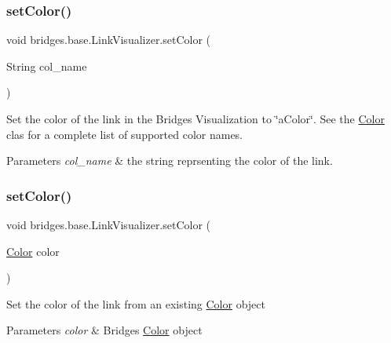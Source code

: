 \subsubsection{\texorpdfstring{set\+Color()}{setColor()}\hspace{0.1cm}{\footnotesize\ttfamily [1/3]}}
{\footnotesize\ttfamily void bridges.\+base.\+Link\+Visualizer.\+set\+Color (\begin{DoxyParamCaption}\item[{String}]{col\+\_\+name }\end{DoxyParamCaption})}

Set the color of the link in the Bridges Visualization to \char`\"{}a\+Color\char`\"{}. See the \mbox{\hyperlink{classbridges_1_1base_1_1_color}{Color}} clas for a complete list of supported color names.


\begin{DoxyParams}{Parameters}
{\em col\+\_\+name} & the string reprsenting the color of the link. \\
\hline
\end{DoxyParams}
\mbox{\label{classbridges_1_1base_1_1_link_visualizer_ab05a7576f99818937276a4937eedeee1}} 
\subsubsection{\texorpdfstring{set\+Color()}{setColor()}\hspace{0.1cm}{\footnotesize\ttfamily [2/3]}}
{\footnotesize\ttfamily void bridges.\+base.\+Link\+Visualizer.\+set\+Color (\begin{DoxyParamCaption}\item[{\mbox{\hyperlink{classbridges_1_1base_1_1_color}{Color}}}]{color }\end{DoxyParamCaption})}

Set the color of the link from an existing \mbox{\hyperlink{classbridges_1_1base_1_1_color}{Color}} object 
\begin{DoxyParams}{Parameters}
{\em color} & Bridges \mbox{\hyperlink{classbridges_1_1base_1_1_color}{Color}} object \\
\hline
\end{DoxyParams}
\mbox{\label{classbridges_1_1base_1_1_link_visualizer_a003905cfe33e1704555b2b3a1cf99bad}} 
